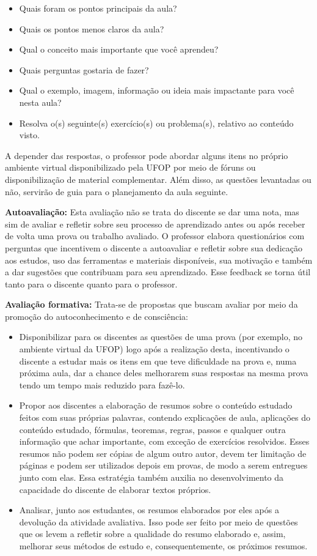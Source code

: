 \documentclass[
	12pt,				%
	openright,			%
	oneside,			%
	a4paper,			%
	english,			%
	brazil				%
	]{abntex2}
\begin{document}
\begin{itemize}
    \item Quais foram os pontos principais da aula?
\item Quais os pontos menos claros da aula?
\item Qual o conceito mais importante que você aprendeu?
\item Quais perguntas gostaria de fazer?
\item Qual o exemplo, imagem, informação ou ideia mais impactante para você nesta aula?
\item Resolva o(s) seguinte(s) exercício(s) ou problema(s), relativo ao conteúdo visto.
\end{itemize}

A depender das respostas, o professor pode abordar alguns itens no próprio ambiente virtual disponibilizado pela UFOP por meio de fóruns ou disponibilização de material complementar. Além disso, as questões levantadas ou não, servirão de guia para o planejamento da aula seguinte.

\noindent \textbf{Autoavaliação:} Esta avaliação não se trata do discente se dar uma nota, mas sim de avaliar e refletir sobre seu processo de aprendizado antes ou após receber de volta uma prova ou trabalho avaliado. O professor elabora questionários com perguntas que incentivem o discente a autoavaliar e refletir sobre sua dedicação aos estudos, uso das ferramentas e materiais disponíveis, sua motivação e também a dar sugestões que contribuam para seu aprendizado. Esse feedback se torna útil tanto para o discente quanto para o professor.

\noindent \textbf{Avaliação formativa:} Trata-se de propostas que buscam avaliar por meio da promoção do autoconhecimento e de consciência:
\begin{itemize}
    \item Disponibilizar para os discentes as questões de uma prova (por exemplo, no ambiente virtual da UFOP) logo após a realização desta, incentivando o discente a estudar mais os itens em que teve dificuldade na prova e, numa próxima aula, dar a chance deles melhorarem suas respostas na mesma prova tendo um tempo mais reduzido para fazê-lo.
    \item Propor aos discentes a elaboração de resumos sobre o conteúdo estudado feitos com suas próprias palavras, contendo explicações de aula, aplicações do conteúdo estudado, fórmulas, teoremas, regras, passos e qualquer outra informação que achar importante, com exceção de exercícios resolvidos. Esses resumos não podem ser cópias de algum outro autor, devem ter limitação de páginas e podem ser utilizados depois em provas, de modo a serem entregues junto com elas. Essa estratégia também auxilia no desenvolvimento da capacidade do discente de elaborar textos próprios.
    \item Analisar, junto aos estudantes, os resumos elaborados por eles após a devolução da atividade avaliativa. Isso pode ser feito por meio de questões que os levem a refletir sobre a qualidade do resumo elaborado e, assim, melhorar seus métodos de estudo e, consequentemente, os próximos resumos.
\end{itemize}
\end{document}
